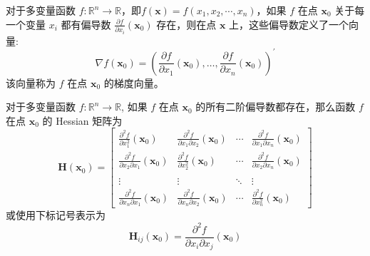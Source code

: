 \documentclass[cn]{elegantbook}
\begin{document}
\begin{definition}[梯度向量]
    对于多变量函数 $f:\mathbb{R}^{n}\rightarrow\mathbb{R}$，即$f(\mathbf{x})=f\left(x_{1},x_{2},\cdots,x_{n}\right)$，如果 $f$ 在点 $\mathbf{x}_{0}$ 关于每一个变量 $x_{i}$ 都有偏导数 $\frac{\partial f}{\partial x_{i}}(\mathbf{x}_{0})$ 存在，则在点 $\mathbf{x}$ 上，这些偏导数定义了一个向量:
    \begin{equation}
        \nabla f(\mathbf{x}_{0})=\left(\frac{\partial f}{\partial x_{1}}(\mathbf{x}_{0}),\ldots,\frac{\partial f}{\partial x_{n}}(\mathbf{x}_{0})\right)^{\prime}
    \end{equation}
    该向量称为 $f$ 在点 $\mathbf{x}_{0}$ 的梯度向量。
\end{definition}

\begin{definition}[Hessian 矩阵]
    对于多变量函数 $f:\mathbb{R}^{n}\rightarrow\mathbb{R}$, 如果 $f$ 在点 $\mathbf{x}_{0}$ 的所有二阶偏导数都存在，那么函数 $f$ 在点 $\mathbf{x}_{0}$ 的 Hessian 矩阵为
    \begin{equation}
        \boldsymbol{H}(\mathbf{x}_{0})=\left[\begin{array}{cccc}
                \frac{\partial^{2} f}{\partial x_{1}^{2}}(\mathbf{x}_{0})            & \frac{\partial^{2} f}{\partial x_{1} \partial x_{2}}(\mathbf{x}_{0}) & \cdots & \frac{\partial^{2} f}{\partial x_{1} \partial x_{n}}(\mathbf{x}_{0}) \\
                \frac{\partial^{2} f}{\partial x_{2} \partial x_{1}}(\mathbf{x}_{0}) & \frac{\partial^{2} f}{\partial x_{2}^{2}}(\mathbf{x}_{0})            & \cdots & \frac{\partial^{2} f}{\partial x_{2} \partial x_{n}}(\mathbf{x}_{0}) \\
                                                                                     &                                                                      &        &                                                                      \\
                \vdots                                                               & \vdots                                                               & \ddots & \vdots                                                               \\
                \frac{\partial^{2} f}{\partial x_{n} \partial x_{1}}(\mathbf{x}_{0}) & \frac{\partial^{2} f}{\partial x_{n} \partial x_{2}}(\mathbf{x}_{0}) & \cdots & \frac{\partial^{2} f}{\partial x_{n}^{2}}(\mathbf{x}_{0})
            \end{array}\right]
    \end{equation}
    或使用下标记号表示为
    \begin{equation}
        \boldsymbol{H}_{i j}(\mathbf{x}_{0})=\frac{\partial^{2} f}{\partial x_{i} \partial x_{j}}(\mathbf{x}_{0})
    \end{equation}
\end{definition}
\end{document}
